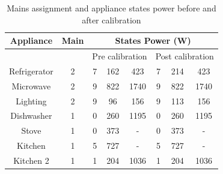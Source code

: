 \documentclass[conference]{IEEEtran}
\begin{document}
%   
%
\begin{table}
\caption{Mains assignment and appliance states power before and after calibration}
\vspace{-8pt}
\label{tab:calibration_factors}
\centering
\begin{minipage}{\columnwidth}

\centering

\begin{tabular}{|c|c|c|c|c|c|c|c|}
\hline
Appliance & Main & \multicolumn{6}{|c|}{States Power (W)}\\
\hline
&&\multicolumn{3}{|c|}{Pre calibration}&\multicolumn{3}{|c|}{Post calibration}\\
\hline
Refrigerator & 2& 7&162&423 & 7&214&423\\
Microwave &2& 9&822&1740& 9&822&1740\\
Lighting & 2& 9&96&156&9&113&156\\
Dishwasher & 1& 0&260& 1195 & 0&260& 1195\\
Stove& 1 & 0&373&-& 0&373&-\\
Kitchen & 1& 5&727&-&5&727&-\\
Kitchen 2&1 & 1&204&1036&1&204&1036 \\
%
%
\hline
%
\end{tabular}
\end{minipage}
\vspace{-5mm}
\end{table}
\vspace{-5mm}
\end{document}
